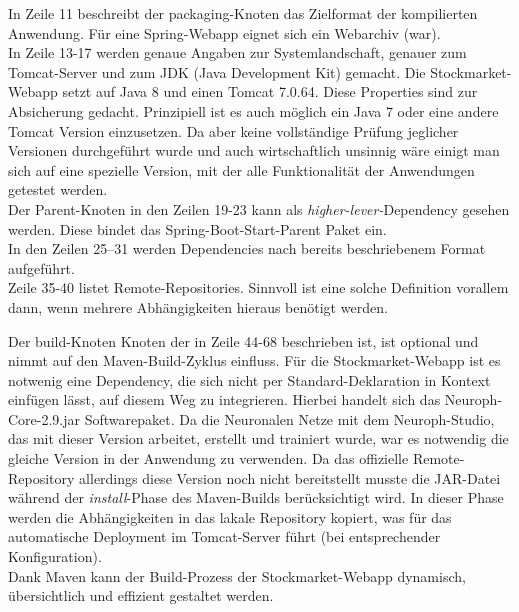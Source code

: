 In Zeile 11 beschreibt der packaging-Knoten das Zielformat der kompilierten Anwendung. Für eine Spring-Webapp eignet sich ein Webarchiv (war).\\ 

In Zeile 13-17 werden genaue Angaben zur Systemlandschaft, genauer zum Tomcat-Server und zum JDK (Java Development Kit) gemacht. Die Stockmarket-Webapp setzt auf Java 8 und einen Tomcat 7.0.64.
Diese Properties sind zur Absicherung gedacht. Prinzipiell ist es auch möglich ein Java 7 oder eine andere Tomcat Version einzusetzen. Da aber keine vollständige Prüfung jeglicher Versionen durchgeführt wurde und auch wirtschaftlich unsinnig wäre einigt man sich auf eine spezielle Version, mit der alle Funktionalität der Anwendungen getestet werden. \\

Der Parent-Knoten in den Zeilen 19-23 kann als \emph{higher-lever-}Dependency gesehen werden. Diese bindet das Spring-Boot-Start-Parent Paket ein.\\

In den Zeilen 25--31 werden Dependencies nach bereits beschriebenem Format aufgeführt.\\

Zeile 35-40 listet Remote-Repositories. Sinnvoll ist eine solche Definition vorallem dann, wenn mehrere Abhängigkeiten hieraus benötigt werden. 

Der build-Knoten Knoten der in Zeile 44-68 beschrieben ist, ist optional und nimmt auf den Maven-Build-Zyklus einfluss. Für die Stockmarket-Webapp ist es notwenig eine Dependency, die sich nicht per Standard-Deklaration in Kontext einfügen lässt, auf diesem Weg zu integrieren. Hierbei handelt sich das Neuroph-Core-2.9.jar Softwarepaket. Da die Neuronalen Netze mit dem Neuroph-Studio, das mit dieser Version arbeitet, erstellt und trainiert wurde, war es notwendig die gleiche Version in der Anwendung zu verwenden. Da das offizielle Remote-Repository allerdings diese Version noch nicht bereitstellt musste die JAR-Datei während der \emph{install}-Phase des Maven-Builds berücksichtigt wird. In dieser Phase werden die Abhängigkeiten in das lakale Repository kopiert, was für das automatische Deployment im Tomcat-Server führt (bei entsprechender Konfiguration). \\
Dank Maven kann der Build-Prozess der Stockmarket-Webapp dynamisch, übersichtlich und effizient gestaltet werden.   

